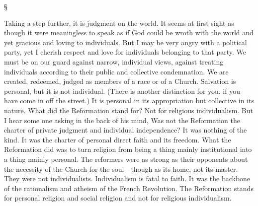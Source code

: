 \documentclass[12pt,letterpaper,oneside]{book}
\begin{document}
\begin{center}
\S
\end{center}

Taking a step further, it is judgment on the 
world. It seems at first sight as though it 
were meaningless to speak as if God could be 
wroth with the world and yet gracious and 
loving to individuals. But I may be very angry 
with a political party, yet I cherish respect and 
love for individuals belonging to that party. 
We must be on our guard against narrow, individual 
views, against treating individuals according 
to their public and collective condemnation. 
We are created, redeemed, judged as members 
of a race or of a Church. Salvation is personal, 
but it is not individual. (There is another distinction for you, if you have come in off the 
street.) It is personal in its appropriation but 
collective in its nature. What did the Reformation stand for? Not for religious individualism. 
But I hear some one asking in the back of his 
mind, Was not the Reformation the charter of 
private judgment and individual independence? 
It was nothing of the kind. It was the charter 
of personal direct faith and its freedom. What 
the Reformation did was to turn religion from 
being a thing mainly institutional into a thing 
mainly personal. The reformers were as strong 
as their opponents about the necessity of the 
Church for the soul---though as its home, not its 
master. They were not individualists. Individualism 
is fatal to faith. It was the backbone 
of the rationalism and atheism of the French 
Revolution. The Reformation stands for personal 
religion and social religion and not for 
religious individualism. 
\end{document}

